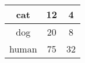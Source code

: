 \documentclass{article}
\begin{document}
\begin{tabular}{| c | c | c |}\hline
cat & 12 & 4\\ \hline 
dog & 20 & 8\\ \hline 
human & 75 & 32\\ \hline 
\end{tabular}
\end{document}
